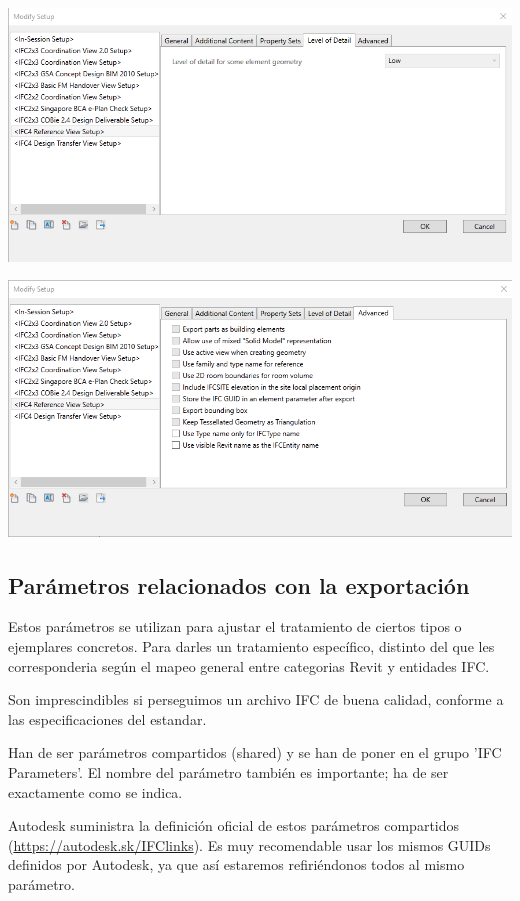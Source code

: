 \documentclass[spanish,12pt,a4paper,final,oneside]{book}
\begin{document}
\includegraphics[width=.9\textwidth]{Revit - exportar IFC - modify setup - 4 - level of detail}

\includegraphics[width=.9\textwidth]{Revit - exportar IFC - modify setup - 5 - advanced}



\subsection{Parámetros relacionados con la exportación}
Estos parámetros se utilizan para ajustar el tratamiento de ciertos tipos o ejemplares concretos. Para darles un tratamiento específico, distinto del que les corresponderia según el mapeo general entre categorias Revit y entidades IFC.

Son imprescindibles si perseguimos un archivo IFC de buena calidad, conforme a las especificaciones del estandar.

Han de ser parámetros compartidos (shared) y se han de poner en el grupo 'IFC Parameters'. El nombre del parámetro también es importante; ha de ser exactamente como se indica.

Autodesk suministra la definición oficial de estos parámetros compartidos (\url{https://autodesk.sk/IFClinks}). Es muy recomendable usar los mismos GUIDs definidos por Autodesk, ya que así estaremos refiriéndonos todos al mismo parámetro.
\end{document}
